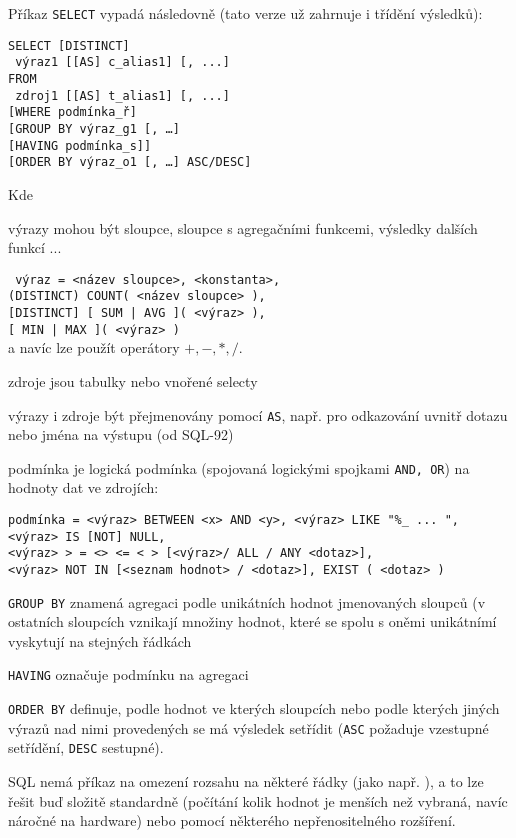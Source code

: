 Příkaz \texttt{SELECT} vypadá následovně (tato verze už zahrnuje i třídění výsledků):
\begin{verbatim}
SELECT [DISTINCT]
 výraz1 [[AS] c_alias1] [, ...]
FROM
 zdroj1 [[AS] t_alias1] [, ...]
[WHERE podmínka_ř]
[GROUP BY výraz_g1 [, …]
[HAVING podmínka_s]]
[ORDER BY výraz_o1 [, …] ASC/DESC]
\end{verbatim}
Kde
\begin{pitemize}
    \item výrazy mohou být sloupce, sloupce s agregačními funkcemi, výsledky dalších funkcí ...

\noindent \texttt{ výraz = <název sloupce>, <konstanta>, \\
 (DISTINCT) COUNT(~<název sloupce>~),\\
{}[DISTINCT] [~SUM~|~AVG~](~<výraz>~),\\
{}[~MIN~|~MAX~](~<výraz>~)}\\
a navíc lze použít operátory $+,-,*,/$.

    \item zdroje jsou tabulky nebo vnořené selecty
    \item výrazy i zdroje být přejmenovány pomocí \texttt{AS}, např. pro odkazování uvnitř dotazu nebo jména na výstupu (od SQL-92)
    \item podmínka je logická podmínka (spojovaná logickými spojkami \texttt{AND, OR}) na hodnoty dat ve zdrojích:

\texttt{podmínka = <výraz> BETWEEN <x> AND <y>, <výraz> LIKE "\%\_ ... ",\\
<výraz> IS [NOT] NULL,\\
<výraz> > = <> <= < > [<výraz>/ ALL / ANY <dotaz>],\\
<výraz> NOT IN [<seznam hodnot> / <dotaz>], EXIST ( <dotaz> )}

    \item \texttt{GROUP BY} znamená agregaci podle unikátních hodnot jmenovaných sloupců (v ostatních sloupcích vznikají množiny hodnot, které se spolu s oněmi unikátnímí vyskytují na stejných řádkách
    \item \texttt{HAVING} označuje podmínku na agregaci
    \item \texttt{ORDER BY} definuje, podle hodnot ve kterých sloupcích nebo podle kterých jiných výrazů nad nimi provedených se má výsledek setřídit (\texttt{ASC} požaduje vzestupné setřídění, \texttt{DESC} sestupné).
\end{pitemize}

SQL nemá příkaz na omezení rozsahu na některé řádky (jako např. ), a to lze řešit buď složitě standardně (počítání kolik hodnot je menších než vybraná, navíc náročné na hardware) nebo pomocí některého nepřenositelného rozšíření.

